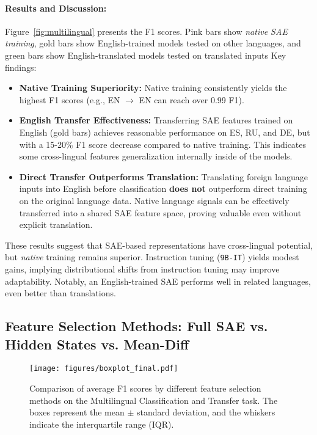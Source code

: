 \paragraph{Results and Discussion:}
Figure~\ref{fig:multilingual} presents the F1 scores. Pink bars show \emph{native SAE training}, gold bars show English-trained models tested on other languages, and green bars show English-translated models tested on translated inputs Key findings:

\begin{itemize}[itemsep=-1.7pt,topsep=1.5pt]
    \item \textbf{Native Training Superiority:} Native training consistently yields the highest F1 scores (e.g., EN $\to$ EN can reach over 0.99 F1).
    \item \textbf{English Transfer Effectiveness:} Transferring SAE features trained on English (gold bars) achieves reasonable performance on ES, RU, and DE, but with a 15-20\% F1 score decrease compared to native training. This indicates some cross-lingual features generalization internally inside of the models.
    \item \textbf{Direct Transfer Outperforms Translation:} Translating foreign language inputs into English before classification \textbf{does not} outperform direct training on the original language data. Native language signals can be effectively transferred into a shared SAE feature space, proving valuable even without explicit translation.
\end{itemize}

These results suggest that SAE-based representations have cross-lingual potential, but \emph{native} training remains superior. Instruction tuning (\texttt{9B-IT}) yields modest gains, implying distributional shifts from instruction tuning may improve adaptability. Notably, an English-trained SAE performs well in related languages, even better than translations.

\subsection{Feature Selection Methods: Full SAE vs. Hidden States vs. Mean-Diff}

\begin{figure}[t]
    \centering
    \texttt{[image: figures/boxplot\_final.pdf]}
    \caption{Comparison of average F1 scores by different feature selection methods on the Multilingual Classification and Transfer task. The boxes represent the mean $\pm$ standard deviation, and the whiskers indicate the interquartile range (IQR).}
    \label{fig:boxplot}
\end{figure}

